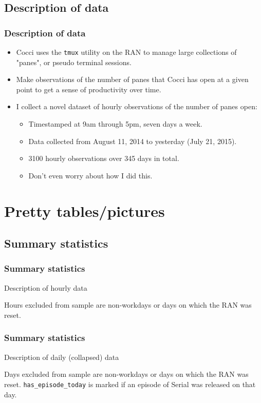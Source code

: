 \documentclass{beamer}
\begin{document}
\subsection{Description of data}
\frame
{
  \frametitle{Description of data}

  \begin{itemize}
  \item<1-> Cocci uses the \texttt{tmux} utility on the RAN to manage large collections of "panes", or pseudo terminal sessions.
  \item<2-> Make observations of the number of panes that Cocci has open at a given point to get a sense of productivity over time.
  \item<3-> I collect a novel dataset of hourly observations of the number of panes open:
    \begin{itemize}
    \item<4-> Timestamped at 9am through 5pm, seven days a week.
    \item<5-> Data collected from August 11, 2014 to yesterday (July 21, 2015).
    \item<6-> 3100 hourly observations over 345 days in total.
    \item<7-> Don't even worry about how I did this.
    \end{itemize}
  \end{itemize}
}

\section{Pretty tables/pictures}
\subsection{Summary statistics}
\frame
{
  \frametitle{Summary statistics}
  
  \begin{table}
  \caption{Description of hourly data}
  
    \begin{tablenotes}
      \footnotesize
      \item Hours excluded from sample are non-workdays or days on which the RAN was reset.
    \end{tablenotes} 
  \end{table}
}

\frame
{
  \frametitle{Summary statistics}
  
  \begin{table}[htbp]
  \caption{Description of daily (collapsed) data}
  
      \begin{tablenotes}
      \footnotesize
  \item Days excluded from sample are non-workdays or days on which the RAN was reset. \texttt{has\_episode\_today} is marked if an episode of Serial was released on that day.
    \end{tablenotes} 
    \end{table}
}
\end{document}
